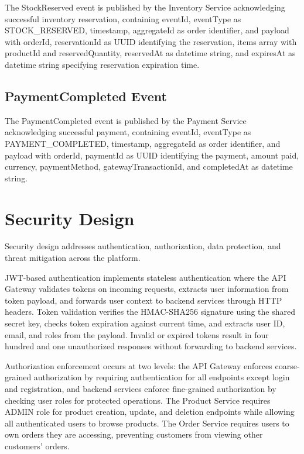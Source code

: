 The StockReserved event is published by the Inventory Service acknowledging successful inventory reservation, containing eventId, eventType as STOCK\_RESERVED, timestamp, aggregateId as order identifier, and payload with orderId, reservationId as UUID identifying the reservation, items array with productId and reservedQuantity, reservedAt as datetime string, and expiresAt as datetime string specifying reservation expiration time.

\subsection{PaymentCompleted Event}

The PaymentCompleted event is published by the Payment Service acknowledging successful payment, containing eventId, eventType as PAYMENT\_COMPLETED, timestamp, aggregateId as order identifier, and payload with orderId, paymentId as UUID identifying the payment, amount paid, currency, paymentMethod, gatewayTransactionId, and completedAt as datetime string.

\section{Security Design}

Security design addresses authentication, authorization, data protection, and threat mitigation across the platform.

JWT-based authentication implements stateless authentication where the API Gateway validates tokens on incoming requests, extracts user information from token payload, and forwards user context to backend services through HTTP headers. Token validation verifies the HMAC-SHA256 signature using the shared secret key, checks token expiration against current time, and extracts user ID, email, and roles from the payload. Invalid or expired tokens result in four hundred and one unauthorized responses without forwarding to backend services.

Authorization enforcement occurs at two levels: the API Gateway enforces coarse-grained authorization by requiring authentication for all endpoints except login and registration, and backend services enforce fine-grained authorization by checking user roles for protected operations. The Product Service requires ADMIN role for product creation, update, and deletion endpoints while allowing all authenticated users to browse products. The Order Service requires users to own orders they are accessing, preventing customers from viewing other customers' orders.

